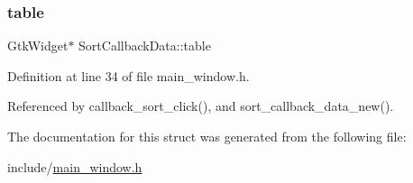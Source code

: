\subsubsection{\texorpdfstring{table}{table}}
{\footnotesize\ttfamily Gtk\+Widget$\ast$ Sort\+Callback\+Data\+::table}



Definition at line 34 of file main\+\_\+window.\+h.



Referenced by callback\+\_\+sort\+\_\+click(), and sort\+\_\+callback\+\_\+data\+\_\+new().



The documentation for this struct was generated from the following file\+:\begin{DoxyCompactItemize}
\item 
include/\mbox{\hyperlink{main__window_8h}{main\+\_\+window.\+h}}\end{DoxyCompactItemize}
